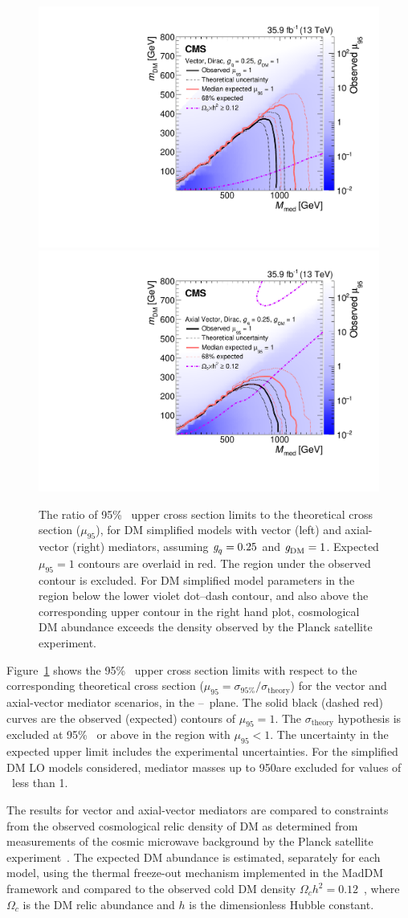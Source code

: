 \begin{figure}[htbp]
  \centering
   \includegraphics[width=0.48\linewidth]{Analysis/Figures/limits_vector.pdf}
    \includegraphics[width=0.48\linewidth]{Analysis/Figures/limits_axial.pdf}
    \caption{
      The ratio of 95\% \CL\ upper cross section limits to the theoretical cross section ($\mu_{95}$), for DM simplified models with vector (left) and axial-vector (right) mediators, assuming $\gq=0.25$ and $\gDM=1$.
      Expected $\mu_{95} = 1$ contours are overlaid in red. 
      The region under the observed contour is excluded. For DM simplified model parameters in the region below the lower violet dot--dash contour, and also above the corresponding upper contour in the right hand plot, cosmological DM abundance exceeds the density observed by the Planck satellite experiment.
    }
    \label{fig:limits}
\end{figure}

Figure~\ref{fig:limits} shows the 95\% \CL\ upper cross section limits with respect to the corresponding theoretical cross section ($\mu_{95}= \sigma_{95\%}/\sigma_{\text{theory}}$) for the  vector and axial-vector mediator scenarios, in the \mmed--\mdm\ plane. 
The solid black (dashed red) curves are the observed (expected) contours of $\mu_{95} = 1$. 
The $\sigma_{\text{theory}}$ hypothesis is excluded at 95\% \CL\ or above in the region with $\mu_{95} < 1$. 
The uncertainty in the expected upper limit includes the experimental uncertainties. 
For the simplified DM LO models considered, mediator masses up to 950\GeV are excluded for values of \mdm\ less than 1\GeV.

The results for vector and axial-vector mediators are compared to constraints
from the observed cosmological relic density of DM as determined from measurements of the cosmic microwave background by the Planck satellite experiment~\cite{Ade:2015xua}.
The expected DM abundance is estimated, separately for each model, using the thermal freeze-out mechanism implemented in the {\sc MadDM}~\cite{Backovic:2013dpa} framework and  compared to the observed cold DM density $\Omega_c h^2=0.12$~\cite{Ade:2015xua}, where $\Omega_c$ is the DM relic abundance and $h$ is the dimensionless Hubble constant.

